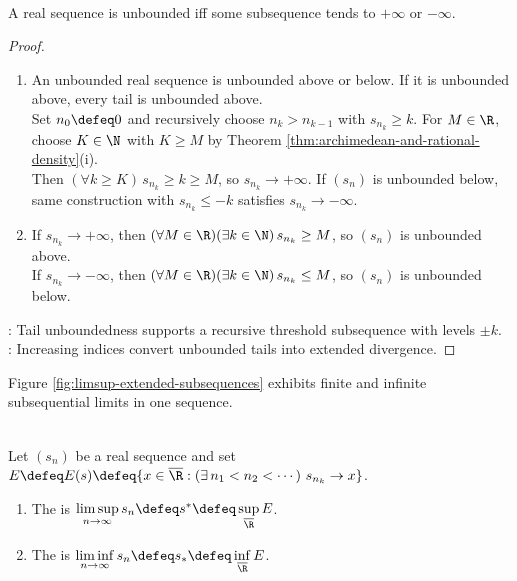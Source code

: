 \begin{proposition} \label{prop:unbounded-real-sequence-has-infinite-subsequence} \\
A real sequence is unbounded iff some subsequence tends to $+\infty$ or $-\infty$.
\begin{proof}
\begin{enumerate}[label=\roman*.]
\setlength{\itemsep}{0pt}
\item[$(\Rightarrow)$] An unbounded real sequence is unbounded above or below. If it is unbounded above, every tail is unbounded above.\\
Set $n_0\defeq0$ and recursively choose $n_k>n_{k-1}$ with $s_{n_k}\geq k$. For $M\in\R$, choose $K\in\N$ with $K\geq M$ by Theorem \ref{thm:archimedean-and-rational-density}(i).\\
Then $(\forall k\geq K)\,s_{n_k}\geq k\geq M$, so $s_{n_k}\to+\infty$. If $(s_n)$ is unbounded below, same construction with $s_{n_k}\leq-k$ satisfies $s_{n_k}\to-\infty$.
\item[$(\Leftarrow)$] If $s_{n_k}\to+\infty$, then $(\forall M\in\R)(\exists k\in\N)\,s_{n_k}\geq M$, so $(s_n)$ is unbounded above.\\
If $s_{n_k}\to-\infty$, then $(\forall M\in\R)(\exists k\in\N)\,s_{n_k}\leq M$, so $(s_n)$ is unbounded below.
\end{enumerate}
: Tail unboundedness supports a recursive threshold subsequence with levels $\pm k$.\\
: Increasing indices convert unbounded tails into extended divergence.
\end{proof}
\end{proposition}

\begin{illustrationfigure}[H]
  \centering
  
  \caption{For $s_n=[(-1)^n+1]n$, odd terms (orange) equal $0$, while even terms (blue) equal $2n$ and tend to $+\infty$.}
  \label{fig:limsup-extended-subsequences}
\end{illustrationfigure}
Figure \ref{fig:limsup-extended-subsequences} exhibits finite and infinite subsequential limits in one sequence.

\begin{definition} \label{def:upper-and-lower-limits} \\
Let $(s_n)$ be a real sequence and set $E\defeq E(s)\defeq\{x\in\overline{\R}:(\exists\,n_1<n_2<\cdots)\ s_{n_k}\to x\}$.
\begin{enumerate}[label=(\roman*)]
\setlength{\itemsep}{0pt}
\item The  is $\limsup\limits_{n\to\infty}s_n\defeq s^*\defeq\sup\limits_{\overline{\R}}E$.
\item The  is $\liminf\limits_{n\to\infty}s_n\defeq s_*\defeq\inf\limits_{\overline{\R}}E$.
\end{enumerate}
\end{definition}

